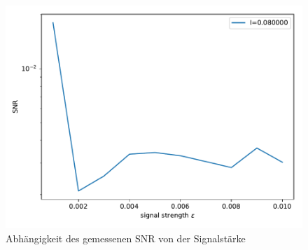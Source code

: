 \documentclass[12pt,a4paper]{article}
\begin{document}
\begin{figure}[H]
	\centering
	\includegraphics[scale=0.9]{snrepsautorealdrange6aem2.pdf}
	\caption{Abhängigkeit des gemessenen SNR von der Signalstärke}
	\label{eps}
\end{figure}
\end{document}

